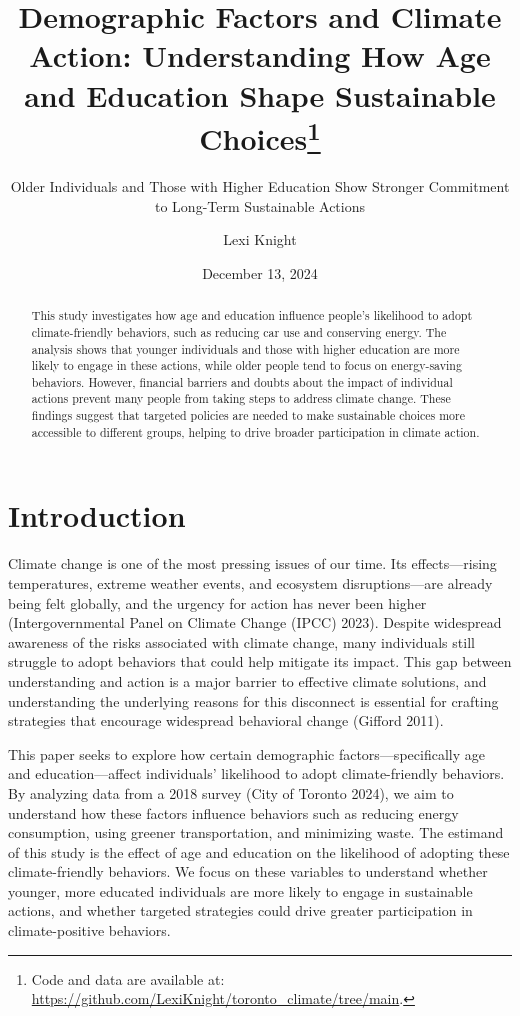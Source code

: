 \documentclass[
  letterpaper,
  DIV=11,
  numbers=noendperiod]{scrartcl}
\title{Demographic Factors and Climate Action: Understanding How Age and
Education Shape Sustainable Choices\thanks{Code and data are available
at: \url{https://github.com/LexiKnight/toronto_climate/tree/main}.}}
\subtitle{Older Individuals and Those with Higher Education Show
Stronger Commitment to Long-Term Sustainable Actions}
\author{Lexi Knight}
\date{December 13, 2024}
\renewcommand*\contentsname{Table of contents}
\newcommand\contentsname{Table of contents}
\begin{document}
\maketitle
\begin{abstract}
This study investigates how age and education influence people's
likelihood to adopt climate-friendly behaviors, such as reducing car use
and conserving energy. The analysis shows that younger individuals and
those with higher education are more likely to engage in these actions,
while older people tend to focus on energy-saving behaviors. However,
financial barriers and doubts about the impact of individual actions
prevent many people from taking steps to address climate change. These
findings suggest that targeted policies are needed to make sustainable
choices more accessible to different groups, helping to drive broader
participation in climate action.
\end{abstract}

\renewcommand*\contentsname{Table of contents}
{
\hypersetup{linkcolor=}
\setcounter{tocdepth}{3}
\tableofcontents
}
\section{Introduction}\label{introduction}

Climate change is one of the most pressing issues of our time. Its
effects---rising temperatures, extreme weather events, and ecosystem
disruptions---are already being felt globally, and the urgency for
action has never been higher (Intergovernmental Panel on Climate Change
(IPCC) 2023). Despite widespread awareness of the risks associated with
climate change, many individuals still struggle to adopt behaviors that
could help mitigate its impact. This gap between understanding and
action is a major barrier to effective climate solutions, and
understanding the underlying reasons for this disconnect is essential
for crafting strategies that encourage widespread behavioral change
(Gifford 2011).

This paper seeks to explore how certain demographic
factors---specifically age and education---affect individuals'
likelihood to adopt climate-friendly behaviors. By analyzing data from a
2018 survey (City of Toronto 2024), we aim to understand how these
factors influence behaviors such as reducing energy consumption, using
greener transportation, and minimizing waste. The estimand of this study
is the effect of age and education on the likelihood of adopting these
climate-friendly behaviors. We focus on these variables to understand
whether younger, more educated individuals are more likely to engage in
sustainable actions, and whether targeted strategies could drive greater
participation in climate-positive behaviors.
\end{document}
